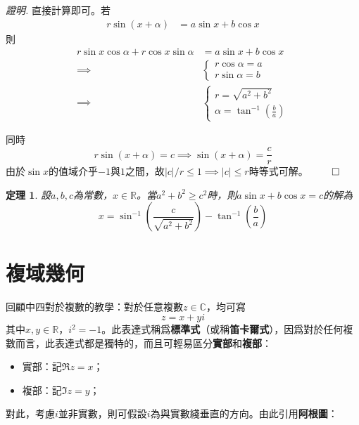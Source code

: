\documentclass[12pt]{article}
\newtheorem*{theorem}{定理}
\renewenvironment*{proof}{\textit{證明.}}{\hfill$\qed$}
\begin{document}
    \begin{proof}
        直接計算即可。若\begin{align*}
            r\sin(x+\alpha)&=a\sin{x}+b\cos{x}
        \end{align*}
        則\begin{align*}
            r\sin{x}\cos{\alpha}+r\cos{x}\sin{\alpha}&=a\sin{x}+b\cos{x}\\
            \implies&\begin{cases}
                r\cos{\alpha}=a\\
                r\sin{\alpha}=b
            \end{cases}\\
            \implies&\begin{cases}
                r=\sqrt{a^2+b^2}\\
                \alpha=\tan^{-1}(\frac{b}{a})
            \end{cases}
        \end{align*}

        同時$$r\sin(x+\alpha)=c\implies \sin(x+\alpha)=\frac{c}{r}$$
        由於$\sin{x}$的值域介乎$-1$與$1$之間，故$|c|/r\leq 1\implies |c|\leq r$時等式可解。
    \end{proof}

    \begin{theorem}
        設$a,b,c$為常數，$x\in\mathbb{R}$。當$a^2+b^2\geq c^2$時，則$a\sin{x}+b\cos{x}=c$的解為$$x=\sin^{-1}(\frac{c}{\sqrt{a^2+b^2}})-\tan^{-1}(\frac{b}{a})$$
    \end{theorem}

    \section*{複域幾何}

    回顧中四對於複數的教學：對於任意複數$z\in\mathbb{C}$，均可寫$$z=x+yi$$其中$x,y\in\mathbb{R}$，$i^2=-1$。此表達式稱爲\textbf{標準式}（或稱\textbf{笛卡爾式}），因爲對於任何複數而言，此表達式都是獨特的，而且可輕易區分\textbf{實部}和\textbf{複部}：\begin{itemize}
        \item 實部：記$\Re{z}=x$；
        \item 複部：記$\Im{z}=y$；
    \end{itemize}

    對此，考慮$i$並非實數，則可假設$i$為與實數綫垂直的方向。由此引用\textbf{阿根圖}：
\end{document}
